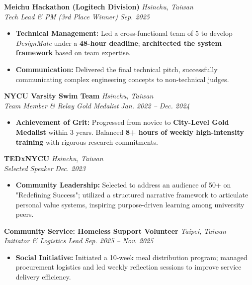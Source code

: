 \documentclass[10pt,letterpaper]{article}
\newenvironment{hangitems}{%
  \begin{itemize}[leftmargin=1.6em,labelsep=0.4em,topsep=2pt,itemsep=2pt,parsep=0pt]
}{%
  \end{itemize}
}
\begin{document}
\noindent
\textbf{Meichu Hackathon (Logitech Division)} \hfill \textit{Hsinchu, Taiwan}\\
\textit{Tech Lead \& PM (3rd Place Winner)} \hfill \textit{Sep. 2025}
\begin{hangitems}
    \item \textbf{Technical Management:} Led a cross-functional team of 5 to develop \textit{DesignMate} under a \textbf{48-hour deadline}; \textbf{architected the system framework} based on team expertise.
    \item \textbf{Communication:} Delivered the final technical pitch, successfully communicating complex engineering concepts to non-technical judges.
\end{hangitems}

\noindent
\textbf{NYCU Varsity Swim Team} \hfill \textit{Hsinchu, Taiwan}\\
\textit{Team Member \& Relay Gold Medalist} \hfill \textit{Jan. 2022 – Dec. 2024}
\begin{hangitems}
    \item \textbf{Achievement of Grit:} Progressed from novice to \textbf{City-Level Gold Medalist} within 3 years. Balanced \textbf{8+ hours of weekly high-intensity training} with rigorous research commitments.
\end{hangitems}

\noindent
\textbf{TEDxNYCU} \hfill \textit{Hsinchu, Taiwan}\\
\textit{Selected Speaker} \hfill \textit{Dec. 2023}
\begin{hangitems}
    \item \textbf{Community Leadership:} Selected to address an audience of 50+ on "Redefining Success"; utilized a structured narrative framework to articulate personal value systems, inspiring purpose-driven learning among university peers.
\end{hangitems}

\noindent
\textbf{Community Service: Homeless Support Volunteer} \hfill \textit{Taipei, Taiwan}\\
\textit{Initiator \& Logistics Lead} \hfill \textit{Sep. 2025 – Nov. 2025}
\begin{hangitems}
    \item \textbf{Social Initiative:} Initiated a 10-week meal distribution program; managed procurement logistics and led weekly reflection sessions to improve service delivery efficiency.
\end{hangitems}

\end{document}
